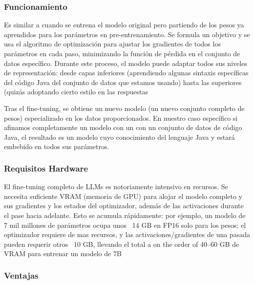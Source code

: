 \subsubsection{Funcionamiento}

Es similar a cuando se entrena el modelo original pero partiendo de los pesos ya aprendidos para los parámetros en pre-entrenamiento. Se formula un objetivo  y se usa el algoritmo de optimización  para ajustar los gradientes de todos los parámetros en cada paso, minimizando la función de pérdida en el conjunto de datos específico. Durante este proceso, el modelo puede adaptar todos sus niveles de representación: desde capas inferiores (aprendiendo algunas sintaxis específicas del código Java del conjunto de datos que estamos usando) hasta las superiores (quizás adoptando cierto estilo en las respuestas

Tras el fine-tuning, se obtiene un nuevo modelo (un nuevo conjunto completo de pesos) especializado en los datos proporcionados. En nuestro caso específico si afinamos completamente un modelo con un con un conjunto de datos de código Java, el resultado es un modelo cuyo conocimiento del lenguaje Java y estará embebido en todos sus parámetros.

\subsubsection{Requisitos Hardware}
El fine-tuning completo de LLMs es notoriamente intensivo en recursos. Se necesita suficiente VRAM (memoria de GPU) para alojar el modelo completo y sus gradientes y los estados del optimizador, además de las activaciones durante el pase hacia adelante. Esto se acumula rápidamente: por ejemplo, un modelo de 7 mil millones de parámetros ocupa unos ~14 GB en FP16 solo para los pesos; el optimizador requiere de mas recursos, y las activaciones/gradientes de una pasada pueden requerir otros ~10 GB, llevando el total a on the order of 40–60 GB de VRAM para entrenar un modelo de 7B\cite{Gpu-Finetuning}

\subsubsection{Ventajas}

